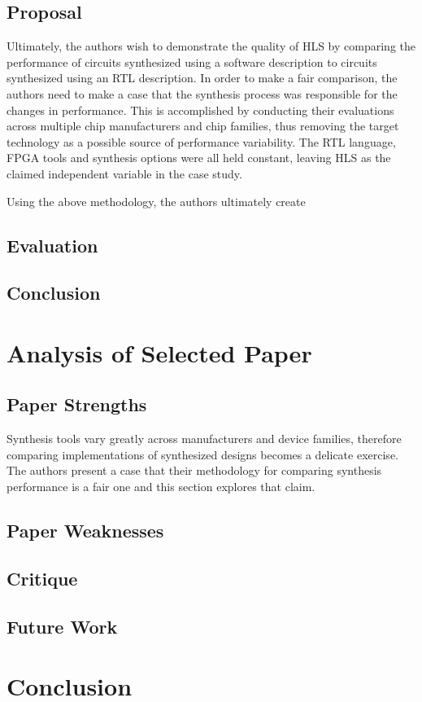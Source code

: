 \documentclass[twocolumn]{article}
\begin{document}
\subsection{Proposal}

Ultimately, the authors wish to demonstrate the quality of HLS by comparing the performance of circuits synthesized using a software description to circuits synthesized using an RTL description. In order to make a fair comparison, the authors need to make a case that the synthesis process was responsible for the changes in performance. This is accomplished by conducting their evaluations across multiple chip manufacturers and chip families, thus removing the target technology as a possible source of performance variability. The RTL language, FPGA tools and synthesis options were all held constant, leaving HLS as the claimed independent variable in the case study. 

Using the above methodology, the authors ultimately create 


\subsection{Evaluation}



\subsection{Conclusion}
\section{Analysis of Selected Paper}
\subsection{Paper Strengths}

Synthesis tools vary greatly across manufacturers and device families, therefore comparing implementations of synthesized designs becomes a delicate exercise. The authors present a case that their methodology for comparing synthesis performance is a fair one and this section explores that claim.

\subsection{Paper Weaknesses}
\subsection{Critique}
\subsection{Future Work}
\section{Conclusion}


\end{document}

